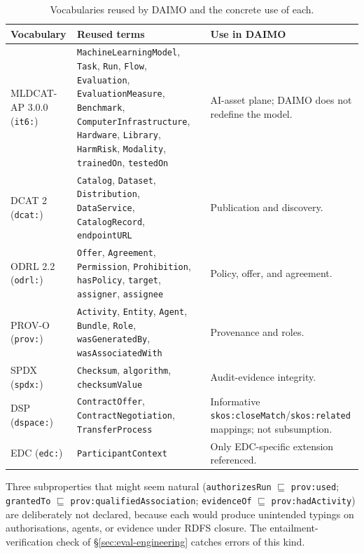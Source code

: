 \documentclass[Afour,sagev,times]{sagej}
\newcommand{\code}[1]{\texttt{#1}}
\begin{document}
\begin{table}[t]
\small\sf\centering
\caption{Vocabularies reused by DAIMO and the concrete use of each.\label{tab:reuse}}
\begin{tabular}{@{}p{2.6cm}p{5cm}p{7cm}@{}}
\toprule
\textbf{Vocabulary} & \textbf{Reused terms} & \textbf{Use in DAIMO} \\
\midrule
MLDCAT-AP 3.0.0 (\code{it6:}) & \code{MachineLearningModel}, \code{Task}, \code{Run}, \code{Flow}, \code{Evaluation}, \code{EvaluationMeasure}, \code{Benchmark}, \code{ComputerInfrastructure}, \code{Hardware}, \code{Library}, \code{HarmRisk}, \code{Modality}, \code{trainedOn}, \code{testedOn} & AI-asset plane; DAIMO does not redefine the model. \\
DCAT 2 (\code{dcat:}) & \code{Catalog}, \code{Dataset}, \code{Distribution}, \code{DataService}, \code{CatalogRecord}, \code{endpointURL} & Publication and discovery. \\
ODRL 2.2 (\code{odrl:}) & \code{Offer}, \code{Agreement}, \code{Permission}, \code{Prohibition}, \code{hasPolicy}, \code{target}, \code{assigner}, \code{assignee} & Policy, offer, and agreement. \\
PROV-O (\code{prov:}) & \code{Activity}, \code{Entity}, \code{Agent}, \code{Bundle}, \code{Role}, \code{wasGeneratedBy}, \code{wasAssociatedWith} & Provenance and roles. \\
SPDX (\code{spdx:}) & \code{Checksum}, \code{algorithm}, \code{checksumValue} & Audit-evidence integrity. \\
DSP (\code{dspace:}) & \code{ContractOffer}, \code{ContractNegotiation}, \code{TransferProcess} & Informative \code{skos:closeMatch}/\code{skos:related} mappings; not subsumption. \\
EDC (\code{edc:}) & \code{ParticipantContext} & Only EDC-specific extension referenced. \\
\bottomrule
\end{tabular}
\end{table}

Three subproperties that might seem natural (\code{authorizesRun} $\sqsubseteq$ \code{prov:used}; \code{grantedTo} $\sqsubseteq$ \code{prov:qualifiedAssociation}; \code{evidenceOf} $\sqsubseteq$ \code{prov:hadActivity}) are deliberately not declared, because each would produce unintended typings on authorisations, agents, or evidence under RDFS closure. The entailment-verification check of §\ref{sec:eval-engineering} catches errors of this kind.

\end{document}
